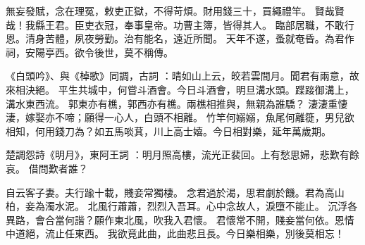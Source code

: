\begin{pinyinscope}
無妄發賦，念在理冤，敕吏正獄，不得苛煩。財用錢三十，買繩禮竿。
 賢哉賢哉！我縣王君。臣吏衣冠，奉事皇帝。功曹主簿，皆得其人。
 臨部居職，不敢行恩。清身苦體，夙夜勞勤。治有能名，遠近所聞。
 天年不遂，蚤就奄昏。為君作祠，安陽亭西。欲令後世，莫不稱傳。


《白頭吟》、與《棹歌》同調，古詞
 ：晴如山上云，皎若雲間月。聞君有兩意，故來相決絕。
  平生共城中，何嘗斗酒會。今日斗酒會，明旦溝水頭。蹀踥御溝上，溝水東西流。
 郭東亦有樵，郭西亦有樵。兩樵相推與，無親為誰驕？
 淒淒重悽淒，嫁娶亦不啼；願得一心人，白頭不相離。
 竹竿何嫋嫋，魚尾何離簁，男兒欲相知，何用錢刀為？如五馬啖萁，川上高士嬉。今日相對樂，延年萬歲期。




楚調怨詩《明月》，東阿王詞
 ：明月照高樓，流光正裴回。上有愁思婦，悲歎有餘哀。
 借問歎者誰？


自云客子妻。夫行踰十載，賤妾常獨棲。
 念君過於渴，思君劇於饑。君為高山柏，妾為濁水泥。
 北風行蕭蕭，烈烈入吾耳。心中念故人，淚墮不能止。
 沉浮各異路，會合當何諧？願作東北風，吹我入君懷。
 君懷常不開，賤妾當何依。恩情中道絕，流止任東西。
 我欲竟此曲，此曲悲且長。今日樂相樂，別後莫相忘！



\end{pinyinscope}